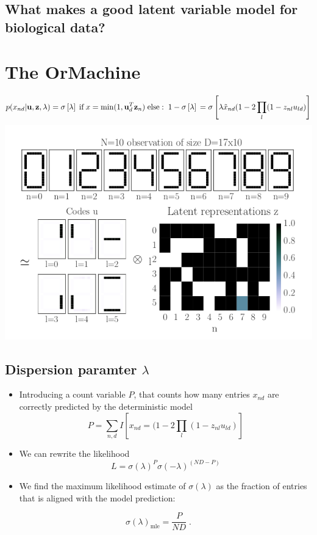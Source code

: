 \documentclass[11pt]{article}
\begin{document}
\subsection*{What makes a good latent variable model for biological data?}
\label{sec-1-3}
\section*{The OrMachine}
\label{sec-2}
$$p(x_{nd}|\mathbf{u},\mathbf{z},\lambda)=
\sigma\left[ \lambda \right]\;\text{if}\;x=\min(1,\mathbf{u}_d^T\mathbf{z}_n)\;\text{else}:\;1-\sigma\left[ \lambda \right] \\
 = \sigma\left[\lambda \tilde{x}_{nd} (1-2\prod\limits_{l}(1-z_{nl}u_{ld}) \right]$$
\includegraphics[width=.9\linewidth]{./calc_digit_intro.png}
\subsection*{Dispersion paramter $\lambda$}
\label{sec-2-1}
\begin{itemize}
\item Introducing a count variable $P$, that counts how many entries $x_{nd}$ are correctly predicted by the deterministic model $$ P = \sum\limits_{n,d} I\left[x_{nd}=(1-2\prod\limits_{l}(1-z_{nl}u_{ld})\right] $$
\item We can rewrite the likelihood
$$ L = \sigma(\lambda)^P \sigma(-\lambda)^{(ND-P)} $$
\item We find the maximum likelihood estimate of $\sigma(\lambda)$ as the fraction of entries that is aligned with the model prediction:
\end{itemize}
$$ \sigma(\lambda)_{\text{mle}} =\frac{P}{ND}\;. $$
\end{document}
